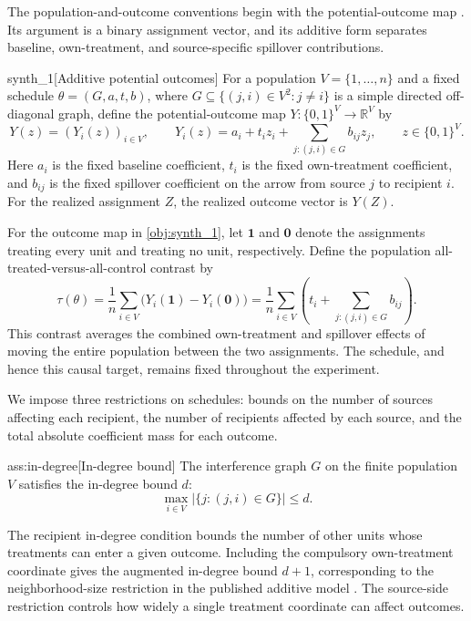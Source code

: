 \documentclass[11pt]{article}
\begin{document}
The population-and-outcome conventions begin with the potential-outcome map . Its argument  is a binary assignment vector, and its additive form separates baseline, own-treatment, and source-specific spillover contributions.

\begin{definitionv}{synth_1}[Additive potential outcomes]
For a population \(V=\{1,\ldots,n\}\) and a fixed schedule \(\theta=(G,a,t,b)\), where \(G\subseteq\{(j,i)\in V^2:j\ne i\}\) is a simple directed off-diagonal graph, define the potential-outcome map \(Y:\{0,1\}^V\to\mathbb R^V\) by
\[
Y(z)=(Y_i(z))_{i\in V},
\qquad
Y_i(z)=a_i+t_i z_i+\sum_{j:(j,i)\in G}b_{ij}z_j,
\qquad z\in\{0,1\}^V.
\]
Here \(a_i\) is the fixed baseline coefficient, \(t_i\) is the fixed own-treatment coefficient, and \(b_{ij}\) is the fixed spillover coefficient on the arrow from source \(j\) to recipient \(i\). For the realized assignment \(Z\), the realized outcome vector is \(Y(Z)\).
\end{definitionv}

For the outcome map in \cref{obj:synth_1}, let \(\boldsymbol 1\) and \(\boldsymbol 0\) denote the assignments treating every unit and treating no unit, respectively. Define the population all-treated-versus-all-control contrast  by
\[
\tau(\theta)
=
\frac1n\sum_{i\in V}\bigl(Y_i(\boldsymbol 1)-Y_i(\boldsymbol 0)\bigr)
=
\frac1n\sum_{i\in V}
\left(t_i+\sum_{j:(j,i)\in G}b_{ij}\right).
\]
This contrast averages the combined own-treatment and spillover effects of moving the entire population between the two assignments. The schedule, and hence this causal target, remains fixed throughout the experiment.

We impose three restrictions on schedules: bounds on the number of sources affecting each recipient, the number of recipients affected by each source, and the total absolute coefficient mass for each outcome.

\begin{assumptionv}{ass:in-degree}[In-degree bound]
The interference graph \(G\) on the finite population \(V\) satisfies the in-degree bound \(d\):
\[
\max_{i\in V}\bigl|\{j:(j,i)\in G\}\bigr|\le d.
\]
\end{assumptionv}

The recipient in-degree condition bounds the number of other units whose treatments can enter a given outcome. Including the compulsory own-treatment coordinate gives the augmented in-degree bound \(d+1\), corresponding to the neighborhood-size restriction in the published additive model \citep{CortezRodriguezEichhornYu2023SNIPE}. The source-side restriction controls how widely a single treatment coordinate can affect outcomes.
\end{document}
